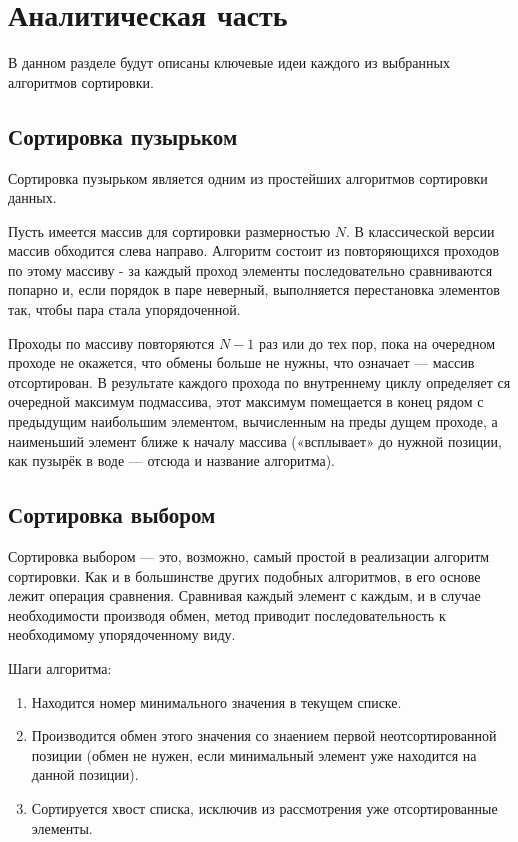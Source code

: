 \chapter{Аналитическая часть}

В данном разделе будут описаны ключевые идеи каждого из вы­бранных алгоритмов сортировки.

\section{Сортировка пузырьком}

Сортировка пузырьком является одним из простейших алгорит­мов сортировки данных.

Пусть имеется массив для сортировки размерностью $N$. В классической версии массив 
обходится слева направо. Алгоритм состоит из повторяющихся проходов по этому
массиву - за каждый про­ход элементы последовательно сравниваются попарно и, 
если порядок в паре неверный, выполняется перестановка элементов так, чтобы пара
стала упорядоченной.\cite{bubble}

Проходы по массиву повторяются $N-1$ раз или до тех пор, пока на очередном проходе
 не окажется, что обмены больше не нужны, что означает — массив отсортирован.
В результате каждого прохода по внутреннему циклу определяет­ ся очередной максимум 
подмассива, этот максимум помещается в конец рядом с предыдущим наибольшим 
элементом, вычисленным на преды­ дущем проходе, а наименьший элемент 
 ближе к началу массива («всплывает» до нужной позиции, как пузырёк в 
 воде — отсюда и название алгоритма).


\section{Сортировка выбором}

Сортировка выбором --- это, возможно, самый простой в реализации алгоритм сортировки. 
Как и в большинстве других подобных алгоритмов, в его основе лежит операция сравнения.
Сравнивая каждый элемент с каждым, и в случае необходимости производя обмен, метод 
приводит последовательность к необходимому упорядоченному виду.

Шаги алгоритма\cite{selandins}:

\begin{enumerate}
	\item Находится номер минимального значения в текущем списке.
	\item Производится обмен этого значения со знаением первой 
    неотсортированной позиции (обмен не нужен, если минимальный элемент 
    уже находится на данной позиции).
    \item Сортируется хвост списка, исключив из рассмотрения уже отсортированные элементы.
\end{enumerate}

